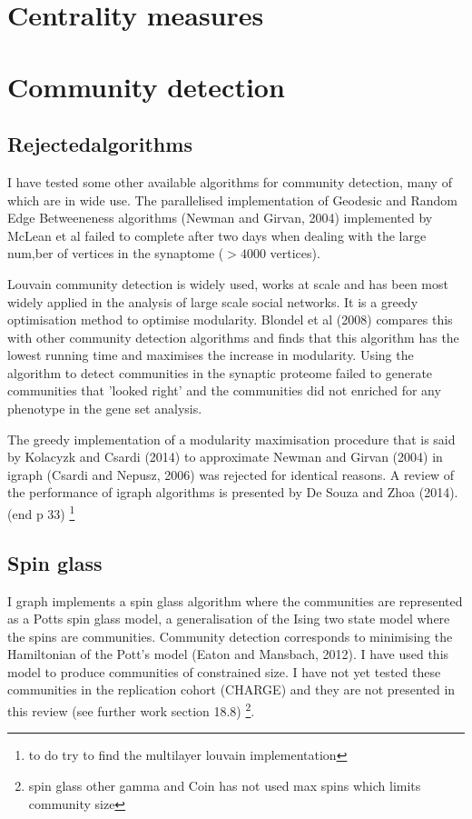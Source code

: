 \section{Centrality measures}
\label{sec: intro_centrality_measures}
\section{Community detection}
\subsection{Rejectedalgorithms}

I have tested some other available algorithms for community detection, many of which are in wide use. The parallelised implementation of Geodesic and Random Edge Betweeneness algorithms (Newman and Girvan, 2004) implemented by McLean et al failed to complete after two days when dealing with the large num,ber of vertices in the synaptome ($>4000$ vertices).\cite{mclean2016improved}

Louvain \cite{blondel2008fast} community detection is widely used, works at scale and has been most widely applied in the analysis of large scale social networks. It is a greedy optimisation method to optimise modularity. 
Blondel et al (2008) compares this with other community detection algorithms and finds that this algorithm has the lowest running time and maximises the increase in modularity.
Using the algorithm to detect communities in the synaptic proteome failed to generate communities that 'looked right' and the communities did not enriched for any phenotype in the gene set analysis.

The greedy implementation of a modularity maximisation procedure that is said by Kolacyzk and Csardi (2014) to approximate Newman and Girvan (2004) in igraph (Csardi and Nepusz, 2006) was rejected for identical reasons. A review of the performance of igraph algorithms is presented by De Souza and Zhoa (2014). (end p 33) \footnote{to do try to find the multilayer louvain implementation}

\subsection{Spin glass}

I graph implements a spin glass algorithm where the communities are represented as a Potts spin glass model, a generalisation of the Ising two state model where the spins are communities. Community detection corresponds to minimising the Hamiltonian of the Pott's model (Eaton and Mansbach, 2012). I have used this model to produce communities of constrained size. I have not yet tested these communities in the replication cohort (CHARGE) and they are not presented in this review (see further work section 18.8) \footnote{spin glass other gamma and Coin has not used max spins which limits community size}.


